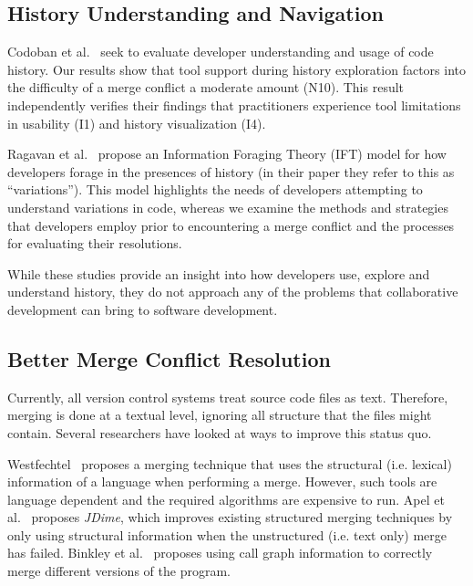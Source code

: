 \subsection{History Understanding and Navigation}

Codoban et al.~\cite{Mihai_lenses} seek to evaluate developer understanding and usage of code history. 
Our results show that tool support during history exploration factors into the difficulty of a merge conflict a moderate amount (N10). 
This result independently verifies their findings that practitioners experience tool limitations in usability (I1) and history visualization (I4).

Ragavan et al.~\cite{ragavan_pfis-v_2017} propose an Information Foraging Theory (IFT) model for how developers forage in the presences of history (in their paper they refer to this as ``variations'').
This model highlights the needs of developers attempting to understand variations in code, whereas we examine the methods and strategies that developers employ prior to encountering a merge conflict and the processes for evaluating their resolutions.

While these studies provide an insight into how developers use, explore and understand history, they do not approach any of the problems that collaborative development can bring to software development.


\subsection{Better Merge Conflict Resolution}

Currently, all version control systems treat source code files as text.
Therefore, merging is done at a textual level, ignoring all structure that the files might contain.
Several researchers have looked at ways to improve this status quo.

Westfechtel~\cite{westfechtel_structure-oriented_1991} proposes a merging technique that uses the structural (i.e. lexical) information of a language when performing a merge. However, such tools are language dependent and the required algorithms are expensive to run.
Apel et al.~\cite{apel_structured_2012-1, apel_semistructured_2011} proposes \emph{JDime}, which improves existing structured merging techniques by only using structural information when the unstructured (i.e. text only) merge has failed.
Binkley et al.~\cite{binkley_program_1995} proposes using call graph information to correctly merge different versions of the program.

